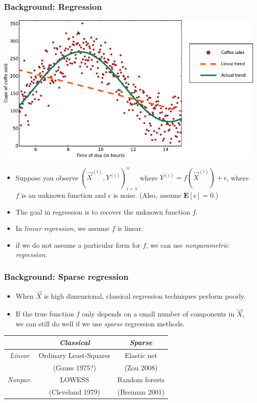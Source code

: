 \documentclass{beamer}
\newcommand{\E}{\textbf{E}}
\begin{document}
\begin{frame}
\frametitle{Background: Regression}
\begin{center}
\includegraphics[scale = 0.2]{data_trend.png}
\end{center}
\begin{itemize}
\item Suppose you observe $(\vec{X}^{(i)}, Y^{(i)})_{i=1}^n$ where $Y^{(i)} = f(\vec{X}^{(i)}) + \epsilon$, where $f$ is an unknown function and $\epsilon$ is noise.  (Also, assume $\E[\epsilon] = 0$.)\pause
\item The goal in regression is to recover the unknown function $f$.\pause
\item In \emph{linear regression}, we assume $f$ is linear. \pause
\item if we do not assume a particular form for $f$, we can use \emph{nonparametric regression}.
\end{itemize}
\end{frame}

\begin{frame}
\frametitle{Background: Sparse regression}
\begin{itemize}
\item When $\vec{X}$ is high dimensional, classical regression techniques perform poorly.\pause
\item If the true function $f$ only depends on a small number of components in $\vec{X}$, we can still do well if we use \emph{sparse} regression methods.\pause
\end{itemize}
\begin{center}
\begin{tabular}{c|c|c|}
 & \emph{Classical} & \emph{Sparse} \\ \hline
 \emph{Linear} & Ordinary Least-Squares  & Elastic net \\ 
  & (Gauss 1975?) & (Zou 2008)  \\\hline
 \emph{Nonpar.} & LOWESS  & Random forests  \\ 
   & (Cleveland 1979) & (Breiman 2001)  \\\hline
\end{tabular}
\end{center}
\end{frame}
\end{document}
